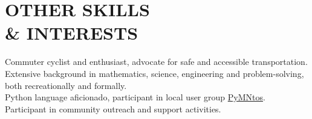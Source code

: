
\section{OTHER SKILLS \\ \& INTERESTS}
    Commuter cyclist and enthusiast, advocate for safe and accessible
    transportation.
    \vspace{1 mm} \\
    Extensive background in mathematics, science, engineering and
    problem-solving, both recreationally and formally.
    \vspace{1 mm} \\
    Python language aficionado, participant in local user group
    \href{http://www.python.mn/}{PyMNtos}. 
    \vspace{1 mm} \\
    Participant in community outreach and support activities.


